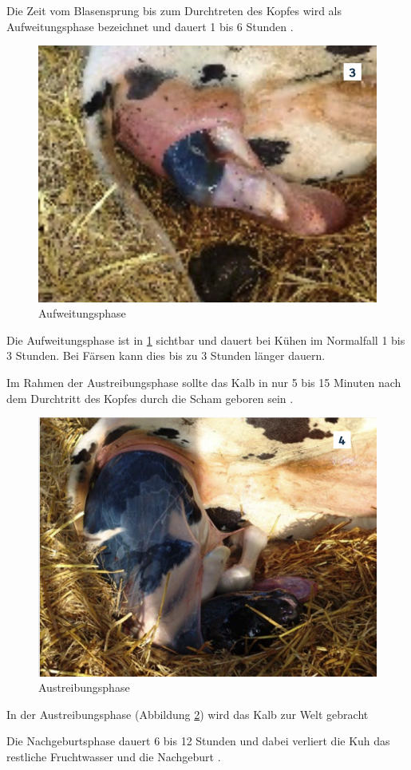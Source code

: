 Die Zeit vom Blasensprung bis zum Durchtreten des Kopfes wird als Aufweitungsphase bezeichnet und dauert 1 bis 6 Stunden \citep[S. 7 ]{Traulsen2013}. 
\begin{figure}[H]
	\center
	\includegraphics[scale=.45]{Grafiken/aufweitungsphase.png}
	\caption{ Aufweitungsphase }
	\label{fig: Aufweitungsphase}
\end{figure} 

Die Aufweitungsphase ist in \ref{fig: Aufweitungsphase} sichtbar und dauert bei Kühen im Normalfall 1 bis 3 Stunden. Bei Färsen kann dies bis zu 3 Stunden länger dauern. \citep[S. 7 ]{Traulsen2013}

Im Rahmen der Austreibungsphase sollte das Kalb in nur 5 bis 15 Minuten nach dem Durchtritt des Kopfes durch die Scham geboren sein \citep[S. 8 ]{Traulsen2013}.  


\begin{figure}[H]
	\center
	\includegraphics[scale=.45]{Grafiken/austreibungsphase.png}
	\caption{Austreibungsphase}
	\label{fig: Austreibungsphase}
\end{figure}

 In der Austreibungsphase (Abbildung \ref{fig: Austreibungsphase}) wird das Kalb zur Welt gebracht \citep[S. 8 ]{Traulsen2013}

Die Nachgeburtsphase dauert 6 bis 12 Stunden und dabei verliert die Kuh das restliche Fruchtwasser und die Nachgeburt \citep[S. 8 ]{Traulsen2013}.  
